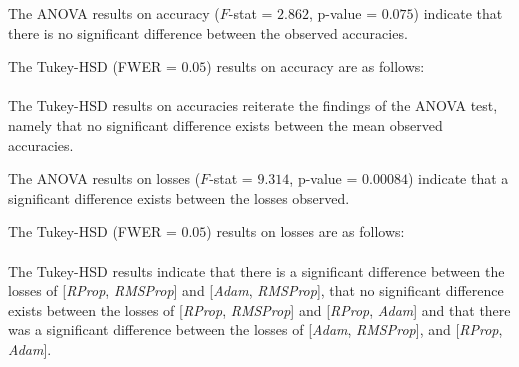 \normalsize

\vspace{0.7em}

The ANOVA results on accuracy ($F$-stat = $2.862$, p-value = $0.075$) indicate that there is no significant difference between the observed accuracies.

The Tukey-HSD (FWER = $0.05$) results on accuracy are as follows: \\

\noindent
{} \\

The Tukey-HSD results on accuracies reiterate the findings of the ANOVA test, namely that no significant 
difference exists between the mean observed accuracies.

The ANOVA results on losses ($F$-stat = $9.314$, p-value = $0.00084$) indicate that a 
significant difference exists between the losses observed.

The Tukey-HSD (FWER = $0.05$) results on losses are as follows: \\

\noindent
{} \\

The Tukey-HSD results indicate that there is a significant difference between the losses of [{\sl RProp}, {\sl RMSProp}] and [{\sl Adam}, {\sl RMSProp}],
that no significant difference exists between the losses of [{\sl RProp}, {\sl RMSProp}] and [{\sl RProp}, {\sl Adam}] and that there was a significant
difference between the losses of [{\sl Adam}, {\sl RMSProp}], and [{\sl RProp}, {\sl Adam}].

